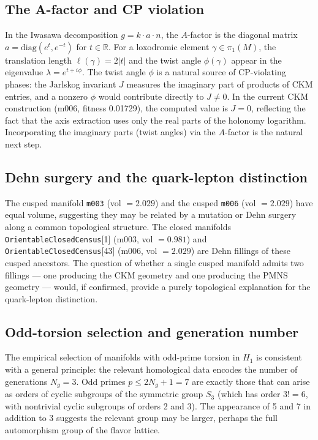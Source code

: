 \documentclass[11pt,a4paper]{article}
\begin{document}
\subsection{The A-factor and CP violation}

In the Iwasawa decomposition $g = k \cdot a \cdot n$, the $A$-factor
is the diagonal matrix $a = \mathrm{diag}(e^t, e^{-t})$ for $t \in \mathbb{R}$.
For a loxodromic element $\gamma \in \pi_1(M)$, the translation
length $\ell(\gamma) = 2|t|$ and the twist angle $\phi(\gamma)$
appear in the eigenvalue $\lambda = e^{t + i\phi}$.
The twist angle $\phi$ is a natural source of CP-violating phases:
the Jarlskog invariant $J$ measures the imaginary part of products
of CKM entries, and a nonzero $\phi$ would contribute directly
to $J \neq 0$.
In the current CKM construction (m006, fitness 0.01729), the
computed value is $J = 0$, reflecting the fact that the axis
extraction uses only the real parts of the holonomy logarithm.
Incorporating the imaginary parts (twist angles) via the $A$-factor
is the natural next step.

\subsection{Dehn surgery and the quark-lepton distinction}

The cusped manifold \texttt{m003} (vol $= 2.029$) and the cusped
\texttt{m006} (vol $= 2.029$) have equal volume, suggesting they
may be related by a mutation or Dehn surgery along a common
topological structure. The closed manifolds
\texttt{OrientableClosedCensus}[1] (m003, vol $= 0.981$) and
\texttt{OrientableClosedCensus}[43] (m006, vol $= 2.029$) are
Dehn fillings of these cusped ancestors.
The question of whether a single cusped manifold admits two fillings
--- one producing the CKM geometry and one producing the PMNS
geometry --- would, if confirmed, provide a purely topological
explanation for the quark-lepton distinction.

\subsection{Odd-torsion selection and generation number}

The empirical selection of manifolds with odd-prime torsion in $H_1$
is consistent with a general principle: the relevant homological
data encodes the number of generations $N_g = 3$.
Odd primes $p \leq 2N_g + 1 = 7$ are exactly those that can arise
as orders of cyclic subgroups of the symmetric group $S_3$
(which has order $3! = 6$, with nontrivial cyclic subgroups of
orders 2 and 3).
The appearance of 5 and 7 in addition to 3 suggests the relevant
group may be larger, perhaps the full automorphism group of the
flavor lattice.
\end{document}

